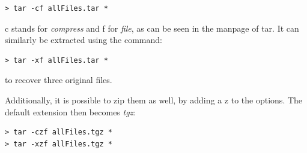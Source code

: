 \begin{itemize}
\begin{mdframed}[backgroundcolor=gray!10]
\begin{verbatim}
> tar -cf allFiles.tar *
\end{verbatim}
\end{mdframed}

c stands for {\it compress} and f for {\it file}, as can be seen in the manpage of tar.
It can similarly be extracted using the command:

\begin{mdframed}[backgroundcolor=gray!10]
\begin{verbatim}
> tar -xf allFiles.tar *
\end{verbatim}
\end{mdframed}

to recover three original files.

Additionally, it is possible to zip them as well, by adding a z to the options. 
The default extension then becomes {\it tgz}:

\begin{mdframed}[backgroundcolor=gray!10]
\begin{verbatim}
> tar -czf allFiles.tgz *
> tar -xzf allFiles.tgz *
\end{verbatim}
\end{mdframed}



\end{itemize}

